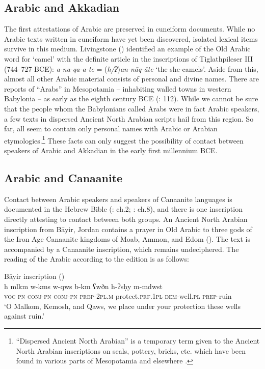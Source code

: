 \documentclass[output=paper]{langsci/langscibook}
\begin{document}
\subsection{Arabic and Akkadian}
The first attestations of Arabic are preserved in cuneiform documents. While no Arabic texts written in cuneiform have yet been discovered, isolated lexical items survive in this medium. Livingstone (\citeyear{Livingstone1997}) identified an example of the Old Arabic word for `camel' with the definite article in the inscriptions of Tiglathpileser III (744--727 BCE): \textit{a-na-qa-a-te} = (\textit{h/ʔ})\textit{an-nāq-āte} ‘the she-camels’. Aside from this, almost all other Arabic material consists of personal and divine names. There are reports of “Arabs” in Mesopotamia – inhabiting walled towns in western Babylonia – as early as the eighth century BCE (\citealt{Ephal1974}: 112). While we cannot be sure that the people whom the Babylonians called Arabs were in fact Arabic speakers, a few texts in dispersed Ancient North Arabian scripts hail from this region. So far, all seem to contain only personal names with Arabic or Arabian etymologies.\footnote{``Dispersed Ancient North Arabian'' is a temporary term given to the Ancient North Arabian inscriptions on seals, pottery, bricks, etc. which have been found in various parts of Mesopotamia and elsewhere \citep[33]{Macdonald2000}.}  These facts can only suggest the possibility of contact between speakers of Arabic and Akkadian in the early first millennium BCE.

\subsection{Arabic and Canaanite}\label{Canaanite}
Contact between Arabic speakers and speakers of Canaanite languages is documented in the Hebrew Bible (\citealt{Ephal1982}: ch.2; \citealt{Retsö2003}: ch.8), and there is one inscription directly attesting to contact between both groups. An Ancient North Arabian inscription from Bāyir, Jordan contains a prayer in Old Arabic to three gods of the Iron Age Canaanite kingdoms of Moab, Ammon, and Edom (\citealt{Hayajnehetal2015}). The text is accompanied by a Canaanite inscription, which remains undeciphered. The reading of the Arabic according to the edition is as follows:

\ea Bāyir inscription (\citealt{Hayajnehetal2015})\\
\gll h 	mlkm 	w-kms 	w-qws 	b-km 		   ʕwðn h-ʔsḥy 		m-mdwst	\\
     \textsc{voc} \textsc{pn} \textsc{conj-pn} \textsc{conj-pn} \textsc{prep-2pl.m} protect.\textsc{prf.1pl} \textsc{dem}-well.\textsc{pl} \textsc{prep}-ruin \\
\glt ‘O Malkom, Kemosh, and Qaws, we place under your protection these wells against ruin.’
\z
\end{document}
